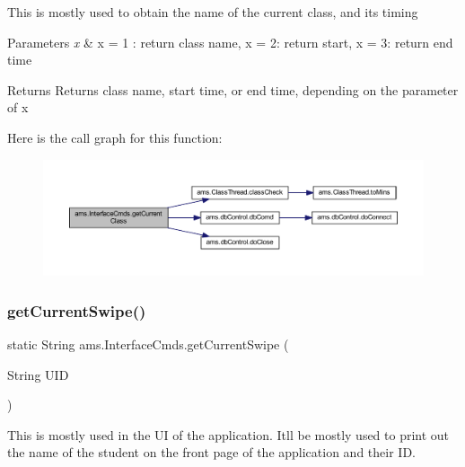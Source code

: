 This is mostly used to obtain the name of the current class, and its timing


\begin{DoxyParams}{Parameters}
{\em x} & x = 1 \+: return class name, x = 2\+: return start, x = 3\+: return end time \\
\hline
\end{DoxyParams}
\begin{DoxyReturn}{Returns}
Returns class name, start time, or end time, depending on the parameter of x 
\end{DoxyReturn}
Here is the call graph for this function\+:\nopagebreak
\begin{figure}[H]
\begin{center}
\leavevmode
\includegraphics[width=350pt]{classams_1_1_interface_cmds_a058a0bca2695aca4f396daddaf009686_cgraph}
\end{center}
\end{figure}
\mbox{\label{classams_1_1_interface_cmds_aaae6e75ca4f733d4af6b2eb27844d730}} 
\subsubsection{\texorpdfstring{getCurrentSwipe()}{getCurrentSwipe()}}
{\footnotesize\ttfamily static String ams.\+Interface\+Cmds.\+get\+Current\+Swipe (\begin{DoxyParamCaption}\item[{String}]{U\+ID }\end{DoxyParamCaption})\hspace{0.3cm}{\ttfamily [static]}}

This is mostly used in the UI of the application. It\textquotesingle{}ll be mostly used to print out the name of the student on the front page of the application and their ID.



